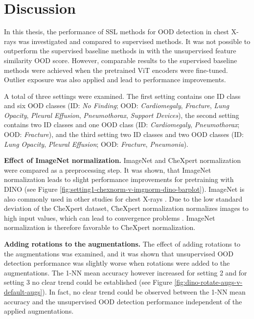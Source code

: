 \section{Discussion}
\label{section: discussion}
In this thesis, the performance of SSL methods for OOD detection in chest X-rays was investigated and compared to supervised methods.
It was not possible to outperform the supervised baseline methods in \citep{Berger2021} with the unsupervised feature similarity OOD score.
However, comparable results to the supervised baseline methods were achieved when the pretrained ViT encoders were fine-tuned.
Outlier exposure was also applied and lead to performance improvements.
\par
A total of three settings were examined.
The first setting contains one ID class and six OOD classes (ID: \textit{No Finding}; OOD: \textit{Cardiomegaly}, \textit{Fracture}, \textit{Lung Opacity}, \textit{Pleural Effusion}, \textit{Pneumothorax}, \textit{Support Devices}), the second setting contains two ID classes and one OOD class (ID: \textit{Cardiomegaly}, \textit{Pneumothorax}; OOD: \textit{Fracture}), and the third setting two ID classes and two OOD classes (ID: \textit{Lung Opacity}, \textit{Pleural Effusion}; OOD: \textit{Fracture}, \textit{Pneumonia}).
\par
\textbf{Effect of ImageNet normalization.} ImageNet and CheXpert normalization were compared as a preprocessing step.
It was shown, that ImageNet normalization leads to slight performance improvements for pretraining with DINO (see Figure \ref{fig:setting1-chexnorm-v-imgnorm-dino-barplot}).
ImageNet is also commonly used in other studies for chest X-rays \citep{Azizi2021,Pham2020}.
Due to the low standard deviation of the CheXpert dataset, CheXpert normalization normalizes images to high input values, which can lead to convergence problems \citep{Lecun2002, He2015, Santurkar2019}.
ImageNet normalization is therefore favorable to CheXpert normalization.
\par
\textbf{Adding rotations to the augmentations.}
The effect of adding rotations to the augmentations was examined, and it was shown that unsupervised OOD detection performance was slightly worse when rotations were added to the augmentations.
The 1-NN mean accuracy however increased for setting 2 and for setting 3 no clear trend could be established (see Figure \ref{fig:dino-rotate-augs-v-default-augs}).
In fact, no clear trend could be observed between the 1-NN mean accuracy and the unsupervised OOD detection performance independent of the applied augmentations.
